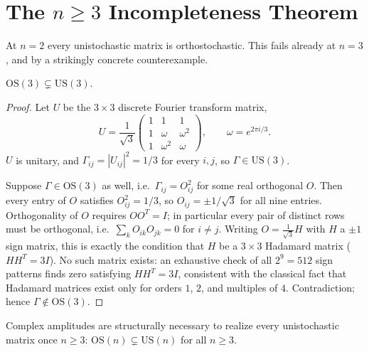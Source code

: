 \section{The \texorpdfstring{$n\ge3$}{n>=3} Incompleteness Theorem}
\label{sec:n3incompleteness}

At $n=2$ every unistochastic matrix is orthostochastic. This fails already at
$n=3$, and by a strikingly concrete counterexample.

\begin{theorem}[Unistochastic strictly larger than orthostochastic, $n=3$]
\label{thm:n3incompleteness}
$\mathrm{OS}(3) \subsetneq \mathrm{US}(3)$.
\end{theorem}

\begin{proof}
Let $U$ be the $3\times3$ discrete Fourier transform matrix,
\begin{equation}
U = \frac{1}{\sqrt3}\begin{pmatrix} 1 & 1 & 1 \\ 1 & \omega & \omega^2 \\ 1 &
\omega^2 & \omega \end{pmatrix}, \qquad \omega = e^{2\pi i/3}.
\end{equation}
$U$ is unitary, and $\Gamma_{ij} = |U_{ij}|^2 = 1/3$ for every $i,j$, so $\Gamma
\in \mathrm{US}(3)$.

Suppose $\Gamma \in \mathrm{OS}(3)$ as well, i.e.\ $\Gamma_{ij} = O_{ij}^2$ for
some real orthogonal $O$. Then every entry of $O$ satisfies $O_{ij}^2 = 1/3$, so
$O_{ij} = \pm 1/\sqrt3$ for all nine entries. Orthogonality of $O$ requires
$O O^T = I$; in particular every pair of distinct rows must be orthogonal, i.e.\
$\sum_k O_{ik} O_{jk} = 0$ for $i \neq j$. Writing $O = \frac{1}{\sqrt3} H$ with
$H$ a $\pm1$ sign matrix, this is exactly the condition that $H$ be a $3\times3$
Hadamard matrix ($H H^T = 3I$). No such matrix exists: an exhaustive check of all
$2^9 = 512$ sign patterns finds zero satisfying $HH^T = 3I$, consistent with the
classical fact that Hadamard matrices exist only for orders $1$, $2$, and
multiples of $4$. Contradiction; hence $\Gamma \notin \mathrm{OS}(3)$.
\end{proof}

\begin{corollary}
\label{cor:n3incompleteness}
Complex amplitudes are structurally necessary to realize every unistochastic
matrix once $n \ge 3$: $\mathrm{OS}(n) \subsetneq \mathrm{US}(n)$ for all $n \ge
3$.
\end{corollary}

